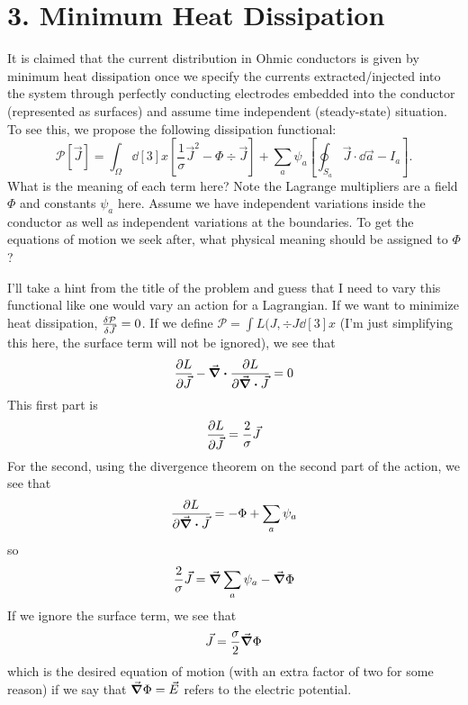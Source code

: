 \documentclass[a4paper,twoside]{article}
\begin{document}
\section*{3. Minimum Heat Dissipation}
It is claimed that the current distribution in Ohmic conductors is given by minimum heat dissipation once we specify the currents extracted/injected into the system through perfectly conducting electrodes embedded into the conductor (represented as surfaces) and assume time independent (steady-state) situation. To see this, we propose the following dissipation functional:
\begin{equation}
    \mathcal{P} [ \vec{J}] = \int_{\Omega} \dd[3]{x} \left[ \frac{1}{\sigma} \vec{J}^2 - \Phi \div{ \vec{J}} \right] + \sum_{a} \psi_{a} \left[ \oint_{S_a} \vec{J} \cdot \dd{ \vec{a}} - I_a \right].
\end{equation}
What is the meaning of each term here? Note the Lagrange multipliers are a field $ \Phi $ and constants $ \psi_a $ here. Assume we have independent variations inside the conductor as well as independent variations at the boundaries. To get the equations of motion we seek after, what physical meaning should be assigned to $ \Phi $?
\begin{problem}
    I'll take a hint from the title of the problem and guess that I need to vary this functional like one would vary an action for a Lagrangian. If we want to minimize heat dissipation, $ \fdv{\mathcal{P}}{ \vec{J}} = 0 $. If we define $ \mathcal{P} = \int L(J, \div{J} \dd[3]{x} $ (I'm just simplifying this here, the surface term will not be ignored), we see that
    \begin{equation}
        \pdv{L}{ \vec{J}} - \div{\pdv{L}{\div{ \vec{J}}}} = 0
    \end{equation}
    This first part is
    \begin{equation}
        \pdv{L}{ \vec{J}} = \frac{2}{\sigma} \vec{J}
    \end{equation}
    For the second, using the divergence theorem on the second part of the action, we see that
    \begin{equation}
        \pdv{L}{\div{ \vec{J}}} = - \Phi + \sum_a \psi_a
    \end{equation}
    so
    \begin{equation}
        \frac{2}{\sigma} \vec{J} = \grad{\sum_a \psi_a} - \grad{\Phi}
    \end{equation}
    If we ignore the surface term, we see that
    \begin{equation}
        \vec{J} = \frac{\sigma}{2}\grad{\Phi}
    \end{equation}
    which is the desired equation of motion (with an extra factor of two for some reason) if we say that $\grad{\Phi} = \vec{E}$ refers to the electric potential.
\end{problem}
\end{document}
